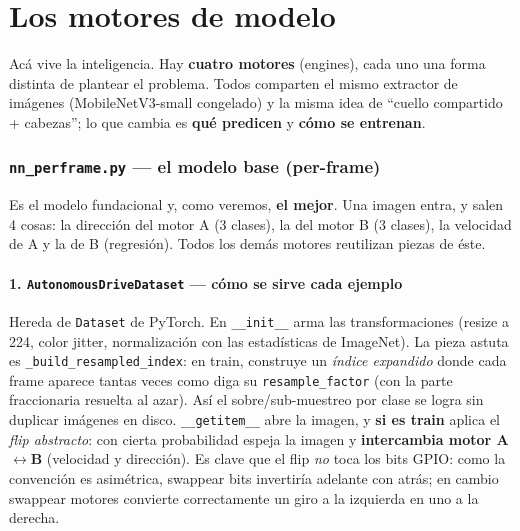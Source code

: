 \documentclass[11pt,a4paper]{article}
\newcommand{\code}[1]{\lstinline[basicstyle=\ttfamily\normalsize]|#1|}
\begin{document}
\part{Los motores de modelo}

Acá vive la inteligencia. Hay \textbf{cuatro motores} (engines), cada uno una forma distinta de plantear el
problema. Todos comparten el mismo extractor de imágenes (MobileNetV3-small congelado) y la misma idea de
``cuello compartido + cabezas''; lo que cambia es \textbf{qué predicen} y \textbf{cómo se entrenan}.

\section{\texttt{nn\_perframe.py} --- el modelo base (per-frame)}
Es el modelo fundacional y, como veremos, \textbf{el mejor}. Una imagen entra, y salen 4 cosas: la dirección
del motor A (3 clases), la del motor B (3 clases), la velocidad de A y la de B (regresión). Todos los demás
motores reutilizan piezas de éste.



\subsection*{1. \texttt{AutonomousDriveDataset} --- cómo se sirve cada ejemplo}
Hereda de \code{Dataset} de PyTorch. En \code{__init__} arma las transformaciones (resize a 224, color jitter,
normalización con las estadísticas de ImageNet). La pieza astuta es \code{_build_resampled_index}: en train,
construye un \emph{índice expandido} donde cada frame aparece tantas veces como diga su \code{resample_factor}
(con la parte fraccionaria resuelta al azar). Así el sobre/sub-muestreo por clase se logra sin duplicar
imágenes en disco. \code{__getitem__} abre la imagen, y \textbf{si es train} aplica el \emph{flip abstracto}:
con cierta probabilidad espeja la imagen y \textbf{intercambia motor A$\leftrightarrow$B} (velocidad y dirección).
Es clave que el flip \emph{no} toca los bits GPIO: como la convención es asimétrica, swappear bits invertiría
adelante con atrás; en cambio swappear motores convierte correctamente un giro a la izquierda en uno a la derecha.
\end{document}
